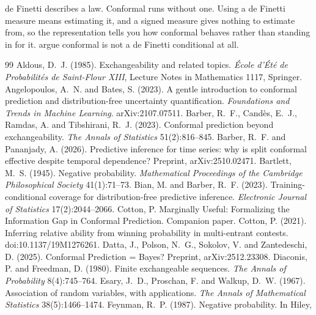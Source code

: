 \documentclass[11pt]{article}
\begin{document}
de Finetti describes a law. Conformal runs without one. Using a de Finetti measure means
estimating it, and a signed measure gives nothing to estimate from, so the representation tells
you how conformal behaves rather than standing in for it. \citet{datta2025} argue conformal is
not a de Finetti conditional at all.

\begin{thebibliography}{99}
 Aldous, D.~J. (1985). Exchangeability and related topics.
\emph{\'Ecole d'\'Et\'e de Probabilit\'es de Saint-Flour XIII}, Lecture Notes in Mathematics
1117, Springer.
 Angelopoulos, A.~N. and Bates,
S. (2023). A gentle introduction to conformal prediction and distribution-free uncertainty
quantification. \emph{Foundations and Trends in Machine Learning}. arXiv:2107.07511.
 Barber, R.~F., Cand\`es, E.~J., Ramdas, A. and
Tibshirani, R.~J. (2023). Conformal prediction beyond exchangeability. \emph{The Annals of
Statistics} 51(2):816--845.
 Barber, R.~F. and Pananjady, A.
(2026). Predictive inference for time series: why is split conformal effective despite temporal
dependence? Preprint, arXiv:2510.02471.
 Bartlett, M.~S. (1945). Negative probability.
\emph{Mathematical Proceedings of the Cambridge Philosophical Society} 41(1):71--73.
 Bian, M. and Barber, R.~F. (2023).
Training-conditional coverage for distribution-free predictive inference. \emph{Electronic
Journal of Statistics} 17(2):2044--2066.
 Cotton, P. Marginally Useful: Formalizing the Information
Gap in Conformal Prediction. Companion paper.
 Cotton, P. (2021). Inferring relative ability from
winning probability in multi-entrant contests. doi:10.1137/19M1276261.
 Datta, J., Polson, N.~G., Sokolov, V. and Zantedeschi,
D. (2025). Conformal Prediction = Bayes? Preprint, arXiv:2512.23308.
 Diaconis, P. and Freedman, D. (1980).
Finite exchangeable sequences. \emph{The Annals of Probability} 8(4):745--764.
 Esary, J.~D., Proschan, F. and Walkup, D.~W. (1967).
Association of random variables, with applications. \emph{The Annals of Mathematical
Statistics} 38(5):1466--1474.
 Feynman, R.~P. (1987). Negative probability. In Hiley,

\end{thebibliography}
\end{document}
